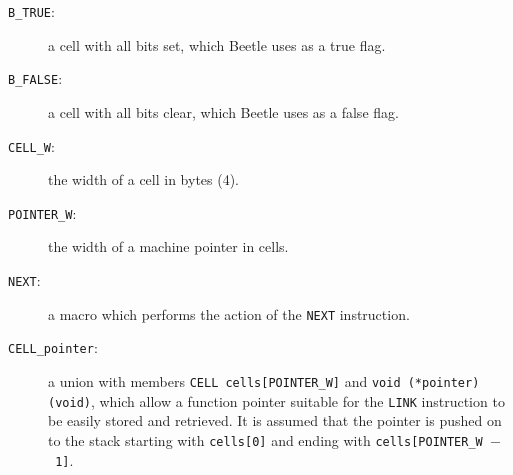 \documentclass[english]{article}
\begin{document}
\begin{description}
\item[{\tt B\_TRUE}:] a cell with all bits set, which Beetle uses as a true
flag.
\item[{\tt B\_FALSE}:] a cell with all bits clear, which Beetle uses as a
false flag.
\item[{\tt CELL\_W}:] the width of a cell in bytes (4).
\item[{\tt POINTER\_W}:] the width of a machine pointer in cells.
\item[{\tt NEXT}:] a macro which performs the action of the {\tt NEXT}
instruction.
\item[{\tt CELL\_pointer}:] a union with members {\tt CELL cells[POINTER\_W]} and {\tt void (*pointer)(void)}, which allow a function pointer suitable for the {\tt LINK} instruction to be easily stored and retrieved. It is assumed that the pointer is pushed on to the stack starting with {\tt cells[0]} and ending with {\tt cells[POINTER\_W~$-$~1]}.
\end{description}




\end{document}
